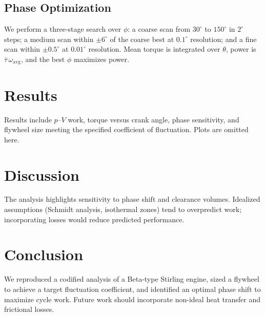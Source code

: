 \documentclass[12pt]{article}
\begin{document}
\subsection{Phase Optimization}
We perform a three-stage search over \(\phi\): a coarse scan from \(30^{\circ}\) to \(150^{\circ}\) in \(2^{\circ}\) steps; a medium scan within \(\pm6^{\circ}\) of the coarse best at \(0.1^{\circ}\) resolution; and a fine scan within \(\pm0.5^{\circ}\) at \(0.01^{\circ}\) resolution. Mean torque is integrated over \(\theta\), power is \(\bar{\tau}\,\omega_{\!\text{avg}}\), and the best \(\phi\) maximizes power.

\section{Results}
Results include $p$--$V$ work, torque versus crank angle, phase sensitivity, and flywheel size meeting the specified coefficient of fluctuation. Plots are omitted here.

\section{Discussion}
The analysis highlights sensitivity to phase shift and clearance volumes. Idealized assumptions (Schmidt analysis, isothermal zones) tend to overpredict work; incorporating losses would reduce predicted performance.

\section{Conclusion}
We reproduced a codified analysis of a Beta-type Stirling engine, sized a flywheel to achieve a target fluctuation coefficient, and identified an optimal phase shift to maximize cycle work. Future work should incorporate non-ideal heat transfer and frictional losses.
\end{document}
